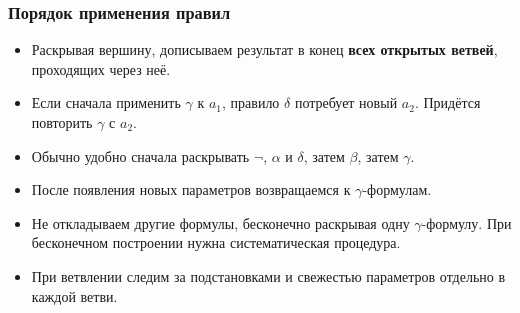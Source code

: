 \documentclass[10pt]{beamer}
\begin{document}
\begin{frame}
\frametitle{Порядок применения правил}
\begin{itemize}
    \item Раскрывая вершину, дописываем результат в конец \textbf{всех открытых ветвей}, проходящих через неё.
    \item Если сначала применить $\gamma$ к $a_1$, правило $\delta$ потребует новый $a_2$. Придётся повторить $\gamma$ с $a_2$.
    \pause
    \item Обычно удобно сначала раскрывать $\neg$, $\alpha$ и $\delta$, затем $\beta$, затем $\gamma$.
    \item После появления новых параметров возвращаемся к $\gamma$-формулам.
    \pause
    \item Не откладываем другие формулы, бесконечно раскрывая одну $\gamma$-формулу. При бесконечном построении нужна систематическая процедура.
    \item При ветвлении следим за подстановками и свежестью параметров отдельно в каждой ветви.
\end{itemize}
\end{frame}
\end{document}

